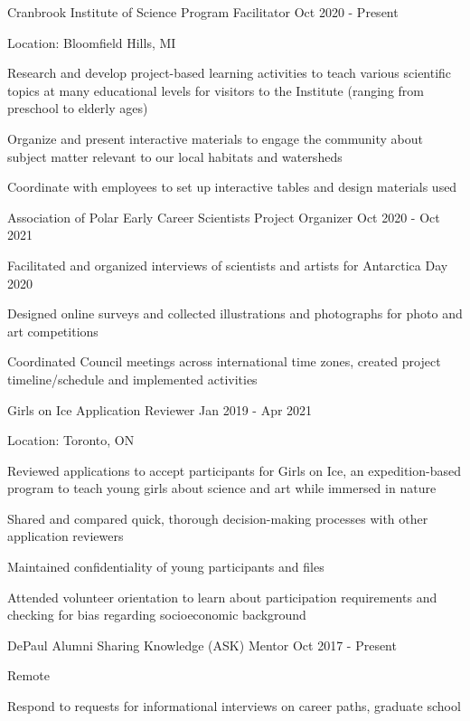 \documentclass{../styles/cv}
\begin{document}
\subsectionpositiondate
    {Cranbrook Institute of Science}
    {Program Facilitator}
    {Oct 2020 - Present}
\resumesublistbegin
    \item Location: Bloomfield Hills, MI
    \item Research and develop project-based learning activities to teach various scientific topics at many educational levels for visitors to the Institute (ranging from preschool to elderly ages)
    \item Organize and present interactive materials to engage the community about subject matter relevant to our local habitats and watersheds
    \item Coordinate with employees to set up interactive tables and design materials used
\resumesublistend

\subsectionpositiondate
    {Association of Polar Early Career Scientists}
    {Project Organizer}
    {Oct 2020 - Oct 2021}
\resumesublistbegin
    \item Facilitated and organized interviews of scientists and artists for Antarctica Day 2020
    \item Designed online surveys and collected illustrations and photographs for photo and art competitions
    \item Coordinated Council meetings across international time zones, created project timeline/schedule and implemented activities
\resumesublistend

\subsectionpositiondate
    {Girls on Ice}
    {Application Reviewer}
    {Jan 2019 - Apr 2021}
\resumesublistbegin
    \item Location: Toronto, ON
    \item Reviewed applications to accept participants for Girls on Ice, an expedition-based program to teach young girls about science and art while immersed in nature
    \item Shared and compared quick, thorough decision-making processes with other application reviewers
    \item Maintained confidentiality of young participants and files
    \item Attended volunteer orientation to learn about participation requirements and checking for bias regarding socioeconomic background
\resumesublistend

\subsectionpositiondate
    {DePaul Alumni Sharing Knowledge (ASK)}
    {Mentor}
    {Oct 2017 - Present}
\resumesublistbegin
    \item Remote
    \item Respond to requests for informational interviews on career paths, graduate school
\resumesublistend
\end{document}
